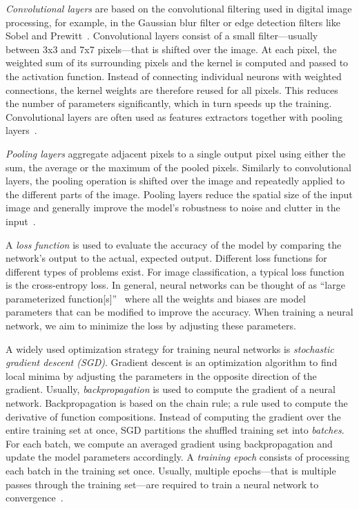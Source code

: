 \documentclass[conference]{IEEEtran}
\begin{document}
\emph{Convolutional layers} are based on the convolutional filtering used in digital image processing, for example, in the Gaussian blur filter or edge detection filters like Sobel and Prewitt~\cite{Stockman:2001:CV:558008}.
Convolutional layers consist of a small filter---usually between 3x3 and 7x7 pixels---that is shifted over the image.
At each pixel, the weighted sum of its surrounding pixels and the kernel is computed and passed to the activation function.
Instead of connecting individual neurons with weighted connections, the kernel weights are therefore reused for all pixels.
This reduces the number of parameters significantly, which in turn speeds up the training.
Convolutional layers are often used as features extractors together with pooling layers~\cite{lecun2010convolutional}.

\emph{Pooling layers} aggregate adjacent pixels to a single output pixel using either the sum, the average or the maximum of the pooled pixels.
Similarly to convolutional layers, the pooling operation is shifted over the image and repeatedly applied to the different parts of the image.
Pooling layers reduce the spatial size of the input image and generally improve the model's robustness to noise and clutter in the input~\cite{lecun2010convolutional,chilimbi2014-Project-Adam}.

A \emph{loss function} is used to evaluate the accuracy of the model by comparing the network's output to the actual, expected output.
Different loss functions for different types of problems exist.
For image classification, a typical loss function is the cross-entropy loss.
%
In general, neural networks can be thought of as ``large parameterized function[s]''~\cite{paine2013-GPU-async-SGD} where all the weights and biases are model parameters that can be modified to improve the accuracy.
When training a neural network, we aim to minimize the loss by adjusting these parameters.

A widely used optimization strategy for training neural networks is \emph{stochastic gradient descent (SGD)}. %
Gradient descent is an optimization algorithm to find local minima by adjusting the parameters in the opposite direction of the gradient.
%
Usually, \emph{backpropagation} is used to compute the gradient of a neural network.
Backpropagation is based on the chain rule; a rule used to compute the derivative of function compositions.
%
Instead of computing the gradient over the entire training set at once, SGD partitions the shuffled training set into \emph{batches}.
For each batch, we compute an averaged gradient using backpropagation and update the model parameters accordingly.
%
A \emph{training epoch} consists of processing each batch in the training set once.
Usually, multiple epochs---that is multiple passes through the training set---are required to train a neural network to convergence~\cite{chilimbi2014-Project-Adam}.
\end{document}
